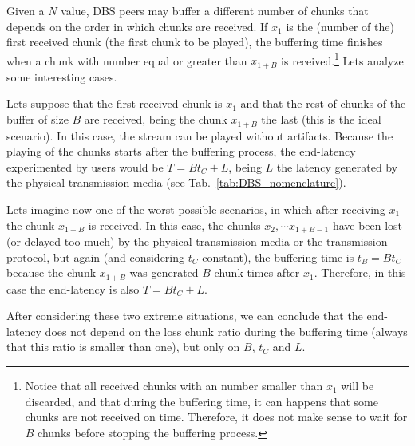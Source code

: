 Given a $N$ value, DBS peers may buffer a different number of chunks
that depends on the order in which chunks are received. If $x_1$ is
the (number of the) first received chunk (the first chunk to be
played), the buffering time finishes when a chunk with number equal or
greater than $x_{1+B}$ is received.\footnote{Notice that all received
  chunks with an number smaller than $x_1$ will be discarded, and that
  during the buffering time, it can happens that some chunks are not
  received on time. Therefore, it does not make sense to wait for $B$
  chunks before stopping the buffering process.} Lets analyze some
interesting cases.

Lets suppose that the first received chunk is $x_1$ and that the rest
of chunks of the buffer of size $B$ are received, being the chunk
$x_{1+B}$ the last (this is the ideal scenario). In this case, the
stream can be played without artifacts. Because the playing of the
chunks starts after the buffering process, the end-latency
experimented by users would be $T=Bt_C+L$, being $L$ the latency
generated by the physical transmission media (see
Tab.~\ref{tab:DBS_nomenclature}).

Lets imagine now one of the worst possible scenarios, in which after
receiving $x_1$ the chunk $x_{1+B}$ is received. In this case, the
chunks $x_2, \cdots x_{1+B-1}$ have been lost (or delayed too much) by
the physical transmission media or the transmission protocol, but
again (and considering $t_C$ constant), the buffering time is $t_B=Bt_C$
because the chunk $x_{1+B}$ was generated $B$ chunk times after
$x_1$. Therefore, in this case the end-latency is also $T=Bt_C+L$.

After considering these two extreme situations, we can conclude that
the end-latency does not depend on the loss chunk ratio during the
buffering time (always that this ratio is smaller than one), but only
on $B$, $t_C$ and $L$.


\begin{comment}
An heuristic that
works is the described in the Fig.~\ref{fig:DBS_peer_buffering}. As
can be seen, $\text{chunk\_to\_play}$ points to the first received
chunk, that not necessary is the received chunk with lower
index. After that, the
buffering finishes when a chunk with index $\text{chunk\_to\_play} +
\text{BUFFER\_SIZE}/2$ has been received.\footnote{This not means that
  $\text{BUFFER\_SIZE}/2$ chunks are available in the buffer.}
\end{comment}
